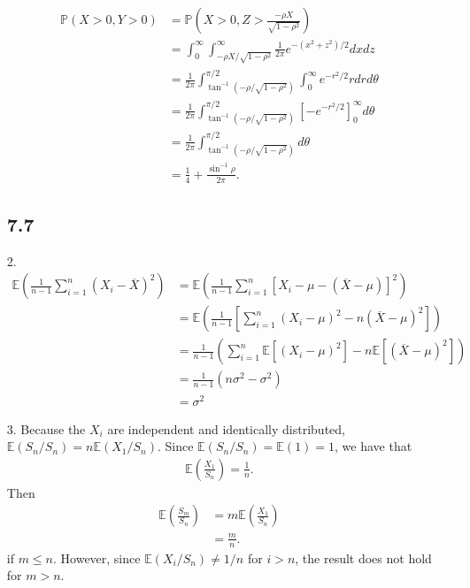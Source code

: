 \documentclass[a4paper,12pt]{article}
\begin{document}
\begin{enumerate}
\begin{align*}
            \mathbb{P}(X > 0, Y > 0) &= \mathbb{P} \left( X > 0, Z > \frac{-\rho X}{\sqrt{1 - \rho^2}} \right) \\
            &= \int_0^\infty \int_{-\rho X / \sqrt{1 - \rho^2}}^\infty \frac{1}{2 \pi} e^{-(x^2 + z^2)/2} dx dz \\
            &= \frac{1}{2\pi} \int_{\tan^{-1} \left( -\rho / \sqrt{1 - \rho^2} \right)}^{\pi / 2} \int_0^\infty e^{-r^2/2} r dr d\theta \\
            &= \frac{1}{2\pi} \int_{\tan^{-1} \left( -\rho / \sqrt{1 - \rho^2} \right)}^{\pi / 2} \left[ -e^{-r^2/2} \right]_0^\infty d\theta \\
            &= \frac{1}{2\pi} \int_{\tan^{-1} \left( -\rho / \sqrt{1 - \rho^2} \right)}^{\pi / 2} d\theta \\
            &= \frac{1}{4} + \frac{\sin^{-1} \rho}{2 \pi}.
        \end{align*}

    \subsection*{7.7}
    \item[2.]
        \begin{align*}
            \mathbb{E} \left( \frac{1}{n - 1} \sum_{i = 1}^n (X_i - \overline{X})^2 \right)
            &= \mathbb{E} \left( \frac{1}{n - 1} \sum_{i = 1}^n [X_i - \mu - (\overline{X} - \mu)]^2 \right) \\
            &= \mathbb{E} \left( \frac{1}{n - 1} \left[ \sum_{i = 1}^n (X_i - \mu)^2 - n(\overline{X} - \mu)^2 \right] \right) \\
            &= \frac{1}{n - 1} \left( \sum_{i = 1}^n \mathbb{E}[(X_i - \mu)^2] - n \mathbb{E}[(\overline{X} - \mu)^2] \right) \\
            &= \frac{1}{n - 1} (n \sigma^2 - \sigma^2) \\
            &= \sigma^2
        \end{align*}

    \item[3.] 
        Because the $X_i$ are independent and identically distributed, $\mathbb{E}(S_n / S_n) = n \mathbb{E}(X_1 / S_n)$. Since $\mathbb{E}(S_n / S_n) = \mathbb{E}(1) = 1$, we have that
        \begin{align*}
            \mathbb{E} \left( \frac{X_1}{S_n} \right) = \frac{1}{n}.
        \end{align*}
        Then
        \begin{align*}
            \mathbb{E} \left( \frac{S_m}{S_n} \right) &= m \mathbb{E} \left( \frac{X_1}{S_n} \right) \\
            &= \frac{m}{n}.
        \end{align*}
        if $m \leq n$. However, since $\mathbb{E}(X_i / S_n) \neq 1 / n$ for $i > n$, the result does not hold for $m > n$.


\end{enumerate}
\end{document}
